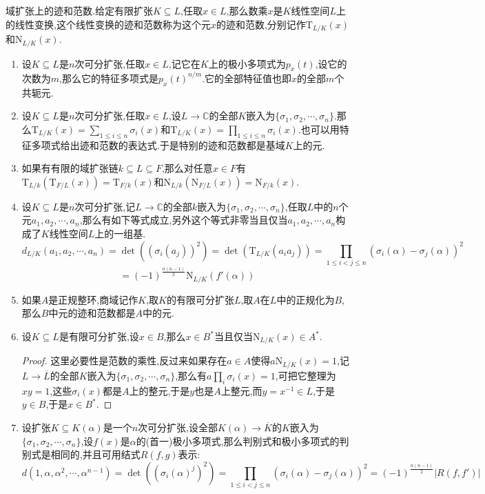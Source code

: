 域扩张上的迹和范数.给定有限扩张$K\subseteq L$,任取$x\in L$,那么数乘$x$是$K$线性空间$L$上的线性变换,这个线性变换的迹和范数称为这个元$x$的迹和范数,分别记作$\mathrm{T}_{L/K}(x)$和$\mathrm{N}_{L/K}(x)$.
\begin{enumerate}
	\item 设$K\subseteq L$是$n$次可分扩张,任取$x\in L$,记它在$K$上的极小多项式为$p_x(t)$,设它的次数为$m$,那么它的特征多项式是$p_x(t)^{n/m}$.它的全部特征值也即$x$的全部$m$个共轭元.
	\item 设$K\subseteq L$是$n$次可分扩张,任取$x\in L$,设$L\to\mathbb{C}$的全部$K$嵌入为$\{\sigma_1,\sigma_2,\cdots,\sigma_n\}$.那么$\mathrm{T}_{L/K}(x)=\sum_{1\le i\le n}\sigma_i(x)$和$\mathrm{T}_{L/K}(x)=\prod_{1\le i\le n}\sigma_i(x)$.也可以用特征多项式给出迹和范数的表达式.于是特别的迹和范数都是基域$K$上的元.
	\item 如果有有限的域扩张链$k\subseteq L\subseteq F$,那么对任意$x\in F$有$\mathrm{T}_{L/k}(\mathrm{T}_{F/L}(x))=\mathrm{T}_{F/k}(x)$和$\mathrm{N}_{L/k}(\mathrm{N}_{F/L}(x))=\mathrm{N}_{F/k}(x)$.
	\item 设$K\subseteq L$是$n$次可分扩张,记$L\to\mathbb{C}$的全部$k$嵌入为$\{\sigma_1,\sigma_2,\cdots,\sigma_n\}$,任取$L$中的$n$个元$a_1,a_2,\cdots,a_n$,那么有如下等式成立,另外这个等式非零当且仅当$a_1,a_2,\cdots,a_n$构成了$K$线性空间$L$上的一组基.
	$$d_{L/K}(a_1,a_2,\cdots,a_n)=\det((\sigma_i(a_j))^2)=\det(\mathrm{T}_{L/K}(a_ia_j))=\prod_{1\le i<j\le n}\left(\sigma_i(\alpha)-\sigma_j(\alpha)\right)^2$$
	$$=(-1)^{\frac{n(n-1)}{2}}\mathrm{N}_{L/K}(f'(\alpha))$$
	\item 如果$A$是正规整环,商域记作$K$,取$K$的有限可分扩张$L$,取$A$在$L$中的正规化为$B$,那么$B$中元的迹和范数都是$A$中的元.
	\item 设$K\subseteq L$是有限可分扩张,设$x\in B$,那么$x\in B^*$当且仅当$\mathrm{N}_{L/K}(x)\in A^*$.
	\begin{proof}
		
		这里必要性是范数的乘性,反过来如果存在$a\in A$使得$a\mathrm{N}_{L/K}(x)=1$,记$L\to\overline{L}$的全部$K$嵌入为$\{\sigma_1,\sigma_2,\cdots,\sigma_n\}$,那么有$a\prod_i\sigma_i(x)=1$,可把它整理为$xy=1$,这些$\sigma_i(x)$都是$A$上的整元,于是$y$也是$A$上整元,而$y=x^{-1}\in L$,于是$y\in B$,于是$x\in B^*$.
	\end{proof}
    \item 设扩张$K\subseteq K(\alpha)$是一个$n$次可分扩张,设全部$K(\alpha)\to\overline{K}$的$K$嵌入为$\{\sigma_1,\sigma_2,\cdots,\sigma_n\}$,设$f(x)$是$\alpha$的(首一)极小多项式,那么判别式和极小多项式的判别式是相同的,并且可用结式$R(f,g)$表示:
    $$d(1,\alpha,\alpha^2,\cdots,\alpha^{n-1})=\det((\sigma_i(\alpha)^j)^2)=\prod_{1\le i<j\le n}(\sigma_i(\alpha)-\sigma_j(\alpha))^2=(-1)^{\frac{n(n-1)}{2}}|R(f,f')|$$
\end{enumerate}

